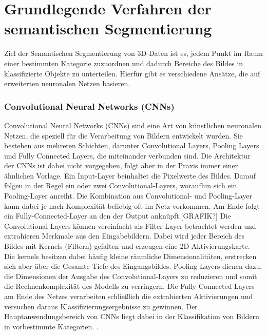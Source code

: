 \chapter{Grundlegende Verfahren der semantischen Segmentierung}

Ziel der Semantischen Segmentierung von 3D-Daten ist es, jedem Punkt im Raum
einer bestimmten Kategorie zuzuordnen und dadurch Bereiche des Bildes in
klassifizierte Objekte zu unterteilen. Hierfür gibt es verschiedene Ansätze,
die auf erweiterten neuronalen Netzen basieren.

\subsection{Convolutional Neural Networks (CNNs)}
Convolutional Neural Networks (CNNs) sind eine Art von künstlichen neuronalen
Netzen, die speziell für die Verarbeitung von Bildern entwickelt wurden. Sie
bestehen aus mehreren Schichten, darunter Convolutional Layers, Pooling Layers
und Fully Connected Layers, die miteinander verbunden sind. Die Architektur der
CNNs ist dabei nicht vorgegeben, folgt aber in der Praxis immer einer ähnlichen
Vorlage. Ein Input-Layer beinhaltet die Pixelwerte des Bildes. Darauf folgen in
der Regel ein oder zwei Convolutional-Layers, woraufhin sich ein Pooling-Layer
anreiht. Die Kombination aus Convolutional- und Pooling-Layer kann dabei je
nach Komplexität beliebig oft im Netz vorkommen. Am Ende folgt ein
Fully-Connected-Layer an den der Output anknüpft.[GRAFIK?] Die Convolutional
Layers können vereinfacht als Filter-Layer betrachtet werden und extrahieren
Merkmale aus den Eingabebildern. Dabei wird jeder Bereich des Bildes mit
Kernels (Filtern) gefalten und erzeugen eine 2D-Aktivierungskarte. Die kernels
besitzen dabei häufig kleine räumliche Dimensionalitäten, erstrecken sich aber
über die Gesamte Tiefe des Eingangsbildes. Pooling Layers dienen dazu, die
Dimensionen der Ausgabe des Convolutional-Layers zu reduzieren und somit die
Rechnenkomplexität des Modells zu verringern. Die Fully Connected Layers am
Ende des Netzes verarbeiten schließlich die extrahierten Aktivierungen und
versuchen daraus Klassifizierungsergebnisse zu gewinnen. Der
Hauptanwendungsbereich von CNNs liegt dabei in der Klassifikation von Bildern
in vorbestimmte Kategorien. \cite{OShea.11262015}.


